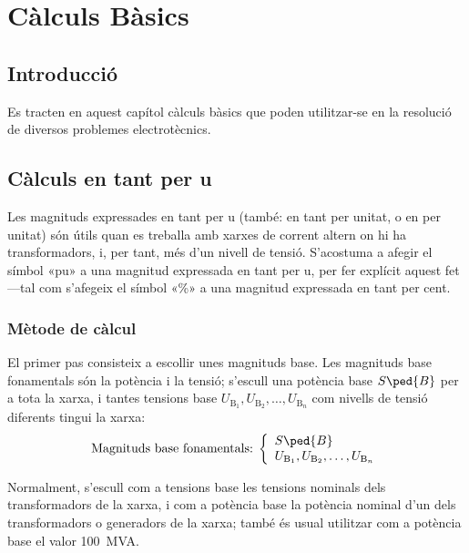 
\chapter{Càlculs Bàsics}\label{sec:ch-calc-bas}

\section{Introducció}
Es tracten en aquest capítol càlculs bàsics que poden utilitzar-se en la
resolució de diversos problemes electrotècnics.



\section{Càlculs en tant per u} \label{sec:seccio_pu} 

Les magnituds expressades en tant per u (també: en tant per unitat, o en per unitat) són útils quan es treballa
amb xarxes de corrent altern on hi ha transformadors, i, per tant, més d'un nivell de tensió. S'acostuma a afegir el símbol «pu» a una magnitud expressada en tant per u,  per fer explícit aquest fet ---tal com s'afegeix el símbol «\%» a una magnitud expressada en tant per cent.

\subsection{Mètode de càlcul} 

 El primer pas consisteix a
escollir unes magnituds base. Les magnituds base fonamentals són la
potència i la tensió; s'escull una potència base $S\ped{B}$ per a
tota la xarxa, i tantes tensions base $U_{\text{B}_1}, U_{\text{B}_2}, \ldots,
U_{\text{B}_n}$ com nivells de tensió
diferents tingui la xarxa:
\begin{equation}
   \text{Magnituds base fonamentals:}\;\left\{
\begin{array}{l}
   S\ped{B} \\
   U_{\text{B}_1}, U_{\text{B}_2}, \ldots, U_{\text{B}_n}
\end{array}
\right.
\end{equation}

Normalment, s'escull com a tensions base les tensions nominals dels transformadors de la
xarxa, i com a potència base la potència nominal d'un dels transformadors o generadors de la xarxa; també és usual utilitzar com a potència base el valor \qty{100}{MVA}.

